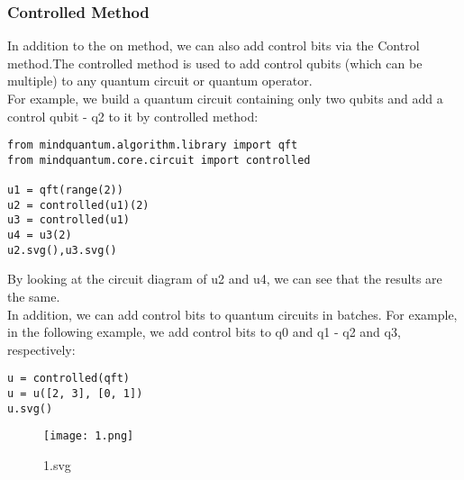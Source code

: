 \subsubsection{Controlled Method}
In addition to the on method, we can also add control bits via the Control method.The controlled method is used to add control qubits (which can be multiple) to any quantum circuit or quantum operator.\\
For example, we build a quantum circuit containing only two qubits and add a control qubit - q2 to it by controlled method:
\begin{lstlisting}
from mindquantum.algorithm.library import qft
from mindquantum.core.circuit import controlled

u1 = qft(range(2))
u2 = controlled(u1)(2)
u3 = controlled(u1)
u4 = u3(2)
u2.svg(),u3.svg()
\end{lstlisting}
By looking at the circuit diagram of u2 and u4, we can see that the results are the same.\\
In addition, we can add control bits to quantum circuits in batches. For example, in the following example, we add control bits to q0 and q1 - q2 and q3, respectively:
\begin{lstlisting}
u = controlled(qft)
u = u([2, 3], [0, 1])
u.svg()
\end{lstlisting}
\begin{figure}[h]
    \centering
    \texttt{[image: 1.png]} %
    \caption{1.svg}
    \label{fig:enter-label}
\end{figure}


